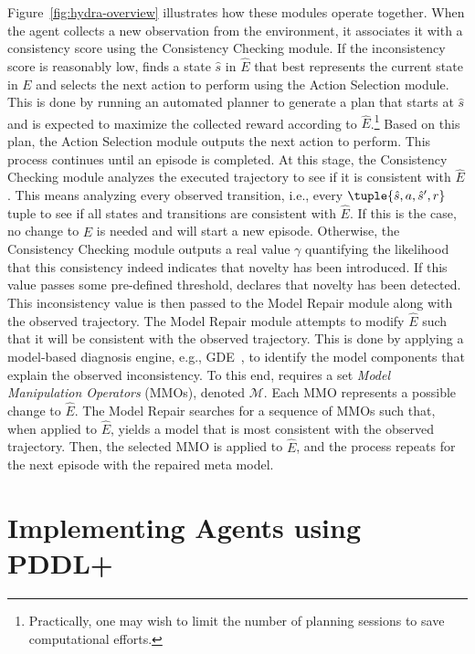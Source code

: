 \documentclass{article}
\begin{document}
Figure~\ref{fig:hydra-overview} illustrates how these modules operate together. 
When the agent collects a new observation from the environment, it associates it with a consistency score using the Consistency Checking module. 
If the inconsistency score is reasonably low, \hydra finds a state $\hat{s}$ in $\hat{E}$ that best represents the current state in $E$ and selects the next action to perform using the Action Selection module. 
This is done by running an automated planner to generate a plan that starts at $\hat{s}$ and is expected to  maximize the collected reward according to $\hat{E}$.\footnote{Practically, one may wish to limit the number of planning sessions to save computational efforts.} 
Based on this plan, the Action Selection module outputs the next action to perform. 
This process continues until an episode is completed. 
At this stage, the Consistency Checking module analyzes the executed trajectory to see if it is consistent with $\hat{E}$. 
This means analyzing every observed transition, i.e., every $\tuple{\hat{s}, a, \hat{s}',r}$ tuple to see if all states and transitions are consistent with $\hat{E}$. 
If this is the case, no change to $\hat{E}$ is needed and \hydra will start a new episode. 
Otherwise, the Consistency Checking module outputs a real value $\gamma$ quantifying the likelihood that this consistency indeed indicates that novelty has been introduced. 
If this value passes some pre-defined threshold, \hydra declares that novelty has been detected. 
This inconsistency value is then passed to the Model Repair module along with the observed trajectory. 
The Model Repair module attempts to modify $\hat{E}$ such that it will be consistent with the observed trajectory. 
This is done by applying a model-based diagnosis engine, e.g., GDE~\cite{dekleer1987diagnosing}, to identify the model components that explain the observed inconsistency. 
To this end, \hydra requires a set \emph{Model Manipulation Operators} (MMOs), denoted $\mathcal{M}$. 
Each MMO represents a possible change to $\hat{E}$. 
The Model Repair searches for a sequence of MMOs such that, when applied to $\hat{E}$, yields a model that is most consistent with the observed trajectory.  
Then, the selected MMO is applied to $\hat{E}$, and the process repeats for the next episode with the repaired meta model. 


\section{Implementing \hydra Agents using PDDL+}
\end{document}
